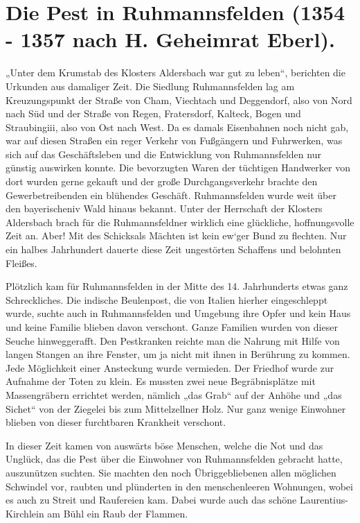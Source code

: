 \documentclass[12pt,a4pager]{book}
\begin{document}
\section{Die Pest in Ruhmannsfelden (1354 - 1357 nach H. Geheimrat Eberl).}

„Unter dem Krumstab des Klosters Aldersbach war gut zu leben“, berichten die
Urkunden aus damaliger Zeit. Die Siedlung Ruhmannsfelden lag am Kreuzungspunkt
der Straße von Cham, Viechtach und Deggendorf, also von Nord nach Süd und der
Straße von Regen, Fratersdorf, Kalteck, Bogen und Straubingiii, also von Ost
nach West. Da es damals Eisenbahnen noch nicht gab, war auf diesen Straßen ein
reger Verkehr von Fußgängern und Fuhrwerken, was sich auf das Geschäftsleben und
die Entwicklung von Ruhmannsfelden nur günstig auswirken konnte. Die bevorzugten
Waren der tüchtigen Handwerker von dort wurden gerne gekauft und der große
Durchgangsverkehr brachte den Gewerbetreibenden ein blühendes Geschäft.
Ruhmannsfelden wurde weit über den bayerischeniv Wald hinaus bekannt. Unter der
Herrschaft der Klosters Aldersbach brach für die Ruhmannsfeldner wirklich eine
glückliche, hoffnungsvolle Zeit an. Aber! Mit des Schicksals Mächten ist kein
ew`ger Bund zu flechten. Nur ein halbes Jahrhundert dauerte diese Zeit
ungestörten Schaffens und belohnten Fleißes.

Plötzlich kam für Ruhmannsfelden in der Mitte des 14. Jahrhunderts etwas ganz
Schreckliches. Die indische Beulenpost, die von Italien hierher eingeschleppt
wurde, suchte auch in Ruhmannsfelden und Umgebung ihre Opfer und kein Haus und
keine Familie blieben davon verschont. Ganze Familien wurden von dieser Seuche
hinweggerafft. Den Pestkranken reichte man die Nahrung mit Hilfe von langen
Stangen an ihre Fenster, um ja nicht mit ihnen in Berührung zu kommen. Jede
Möglichkeit einer Ansteckung wurde vermieden. Der Friedhof wurde zur Aufnahme
der Toten zu klein. Es mussten zwei neue Begräbnisplätze mit Massengräbern
errichtet werden, nämlich „das Grab“ auf der Anhöhe und „das Sichet“ von der
Ziegelei bis zum Mittelzellner Holz. Nur ganz wenige Einwohner blieben von
dieser furchtbaren Krankheit verschont.

In dieser Zeit kamen von auswärts böse Menschen, welche die Not und das Unglück,
das die Pest über die Einwohner von Ruhmannsfelden gebracht hatte, auszunützen
suchten. Sie machten den noch Übriggebliebenen allen möglichen Schwindel vor,
raubten und plünderten in den menschenleeren Wohnungen, wobei es auch zu Streit
und Raufereien kam. Dabei wurde auch das schöne Laurentius-Kirchlein am Bühl ein
Raub der Flammen.
\end{document}
